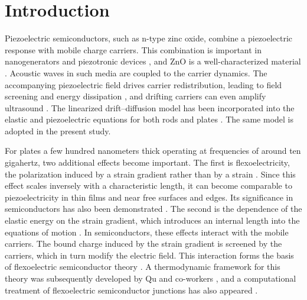 \section{Introduction}
\label{sec:intro}

Piezoelectric semiconductors, such as n-type zinc oxide, combine a piezoelectric response with mobile charge carriers.  This combination is important in nanogenerators and piezotronic devices \cite{wang2006nanogenerators}, and ZnO is a well-characterized material \cite{ozgur2005zno}.  Acoustic waves in such media are coupled to the carrier dynamics.  The accompanying piezoelectric field drives carrier redistribution, leading to field screening and energy dissipation \cite{hutson1962elastic}, and drifting carriers can even amplify ultrasound \cite{white1962amplification}.  The linearized drift--diffusion model has been incorporated into the elastic and piezoelectric equations for both rods \cite{zhang2016extensional} and plates \cite{zhang2025pscplate}.  The same model is adopted in the present study.

For plates a few hundred nanometers thick operating at frequencies of around ten gigahertz, two additional effects become important.  The first is flexoelectricity, the polarization induced by a strain gradient rather than by a strain \cite{tagantsev1986piezo,majdoub2008enhanced,yudin2013fundamentals,zubko2013flexoelectric,shen2010theory}.  Since this effect scales inversely with a characteristic length, it can become comparable to piezoelectricity in thin films and near free surfaces and edges.  Its significance in semiconductors has also been demonstrated \cite{bhaskar2016flexoelectric}.  The second is the dependence of the elastic energy on the strain gradient, which introduces an internal length into the equations of motion \cite{mindlin1964micro}.  In semiconductors, these effects interact with the mobile carriers.  The bound charge induced by the strain gradient is screened by the carriers, which in turn modify the electric field.  This interaction forms the basis of flexoelectric semiconductor theory \cite{qu2020mobile,qu2022thermal,qu2022bending}.  A thermodynamic framework for this theory was subsequently developed by Qu and co-workers \cite{qu2025thermodynamic}, and a computational treatment of flexoelectric semiconductor junctions has also appeared \cite{hu2025computational}.


